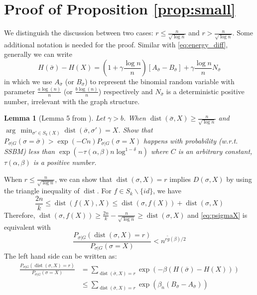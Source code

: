 \documentclass[journal]{IEEEtran}
\newtheorem{lemma}{Lemma}
\newcommand{\A}{\frac{a \log(n)}{n}}
\newcommand{\B}{\frac{b \log(n)}{n}}
\newcommand{\1}{\mathbbm{1}}
\DeclareMathOperator{\dist}{dist}
\begin{document}
\section*{Proof of Proposition \ref{prop:small}}
We distinguish the discussion between two cases: $r\leq \frac{n}{\sqrt{\log n}}$
and $r > \frac{n}{\sqrt{\log n}}$. Some additional notation is needed for the proof.
Similar with \eqref{eq:energy_diff}, generally we can write
$$
H(\bar{\sigma}) - H(X)=
(1 + \gamma \frac{ \log n}{n})[A_{\bar{\sigma}} - B_{\bar{\sigma}}] + \gamma\frac{ \log n}{n} N_{\bar{\sigma}}
$$
in which we use $A_{\bar{\sigma}}$ (or $B_{\bar{\sigma}}$) to represent the binomial random variable with parameter $\A$ (or $\B$)
respectively and $N_{\bar{\sigma}}$ is a deterministic positive number, irrelevant with the graph structure.
\begin{lemma}[Lemma 5 from \cite{sibmmc}]\label{lem:sigmaX}
	Let $\gamma > b$. When $\dist(\bar{\sigma}, X) \geq \frac{n}{\sqrt{\log n}}$ and $\arg\,\min_{\sigma'\in S_k(X)} \dist(\bar{\sigma}, \sigma') = X$. Show that
	$P_{\sigma | G}(\sigma = \bar{\sigma} ) > \exp(-Cn) P_{\sigma | G}(\sigma = X)$
	happens with probability (w.r.t. SSBM) less than $\exp(-\tau(\alpha,\beta) n \log^{1-\delta} n )$ where $C$ is an arbitrary constant, $\tau(\alpha,\beta)$ is a positive number.
\end{lemma}
When $r\leq \frac{n}{\sqrt{\log n}}$, we can show that $\dist(\sigma, X) = r$ implies $D(\sigma, X)$ by using the triangle
inequality of $\dist$. For $f \in S_k \backslash \{ id \}$, we have
$$
\frac{2n}{k} \leq \dist(f(X), X) \leq \dist(\sigma, f(X)) + \dist(\sigma, X)
$$
Therefore, $\dist(\sigma, f(X)) \geq \frac{2n}{k} - \frac{n}{\sqrt{\log n}} \geq \dist(\sigma, X)$ and
\eqref{eq:psigmaX} is equivalent with
\begin{equation}\label{eq:psigmaX2}
\frac{P_{\sigma|G}(\dist(\sigma, X)=r)}
{P_{\sigma|G}(\sigma=X)} <
n^{r \tilde{g}(\beta) /2}
\end{equation}
The left hand side can be written as:
\begin{align*}
\frac{P_{\sigma|G}(\dist(\sigma, X)=r)}
{P_{\sigma|G}(\sigma=X)}  &= \sum_{\dist(\bar{\sigma}, X)=r}\exp(-\beta(H(\bar{\sigma})-H(X)))\\
&\leq \sum_{\dist(\bar{\sigma}, X)=r}\exp(\beta_n(B_{\bar{\sigma}}-A_{\bar{\sigma}}))
\end{align*}
\end{document}
